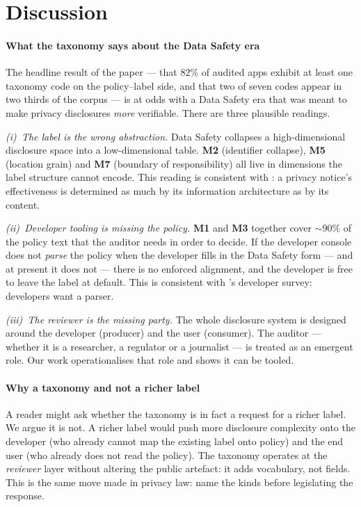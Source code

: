 \documentclass[11pt,a4paper]{article}
\newcommand{\code}[1]{\textsf{\textbf{#1}}}
\begin{document}
\section{Discussion}\label{sec:disc}

\paragraph{What the taxonomy says about the Data Safety era}
The headline result of the paper --- that $82\%$ of audited apps
exhibit at least one taxonomy code on the policy--label side, and
that two of seven codes appear in two thirds of the corpus --- is at
odds with a Data Safety era that was meant to make privacy
disclosures \emph{more} verifiable. There are three plausible
readings.

\emph{(i)~The label is the wrong abstraction.} Data Safety collapses
a high-dimensional disclosure space into a low-dimensional table.
\code{M2} (identifier collapse), \code{M5} (location grain) and
\code{M7} (boundary of responsibility) all live in dimensions the
label structure cannot encode. This reading is consistent with
\citet{schaub2015design}: a privacy notice's effectiveness is
determined as much by its information architecture as by its
content.

\emph{(ii)~Developer tooling is missing the policy.} \code{M1} and
\code{M3} together cover $\sim\!90\%$ of the policy text that the
auditor needs in order to decide. If the developer console does not
\emph{parse} the policy when the developer fills in the Data Safety
form --- and at present it does not --- there is no enforced
alignment, and the developer is free to leave the label at default.
This is consistent with \citet{khandelwal2024unpacking}'s developer
survey: developers want a parser.

\emph{(iii)~The reviewer is the missing party.} The whole disclosure
system is designed around the developer (producer) and the user
(consumer). The auditor --- whether it is a researcher, a regulator
or a journalist --- is treated as an emergent role. Our work
operationalises that role and shows it can be tooled.

\paragraph{Why a taxonomy and not a richer label}
A reader might ask whether the taxonomy is in fact a request for a
richer label. We argue it is not. A richer label would push more
disclosure complexity onto the developer (who already cannot map the
existing label onto policy) and the end user (who already does not
read the policy). The taxonomy operates at the \emph{reviewer} layer
without altering the public artefact: it adds vocabulary, not
fields. This is the same move \citet{solove2006taxonomy} made in
privacy law: name the kinds before legislating the response.
\end{document}
